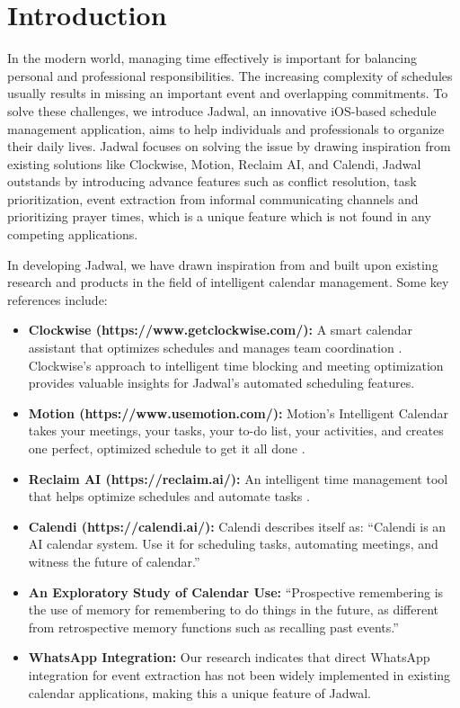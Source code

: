 \documentclass[12pt,a4paper]{report}
\begin{document}
\section{Introduction}
In the modern world, managing time effectively is important for balancing personal and professional responsibilities. The increasing complexity of schedules usually results in missing an important event and overlapping commitments. To solve these challenges, we introduce Jadwal, an innovative iOS-based schedule management application, aims to help individuals and professionals to organize their daily lives.
Jadwal focuses on solving the issue by drawing inspiration from existing solutions like Clockwise, Motion, Reclaim AI, and Calendi, Jadwal outstands by introducing advance features such as conflict resolution, task prioritization, event extraction from informal communicating channels and prioritizing prayer times, which is a unique feature which is not found in any competing applications. 

In developing Jadwal, we have drawn inspiration from and built upon existing research and products in the field of intelligent calendar management. Some key references include:
\begin{itemize}
    \item \textbf{Clockwise (https://www.getclockwise.com/):} A smart calendar assistant that optimizes schedules and manages team coordination \cite{clockwise}. Clockwise's approach to intelligent time blocking and meeting optimization provides valuable insights for Jadwal's automated scheduling features.
    \item \textbf{Motion (https://www.usemotion.com/):} Motion's Intelligent Calendar takes your meetings, your tasks, your to-do list, your activities, and creates one perfect, optimized schedule to get it all done \cite{motion}.
    \item \textbf{Reclaim AI (https://reclaim.ai/):} An intelligent time management tool that helps optimize schedules and automate tasks \cite{reclaim}.
    \item \textbf{Calendi (https://calendi.ai/):} Calendi describes itself as: ``Calendi is an AI calendar system. Use it for scheduling tasks, automating meetings, and witness the future of calendar.'' \cite{calendi}
    \item \textbf{An Exploratory Study of Calendar Use:} ``Prospective remembering is the use of memory for remembering to do things in the future, as different from retrospective memory functions such as recalling past events.'' \cite{tungare2008exploratorystudycalendaruse}
    \item \textbf{WhatsApp Integration:} Our research indicates that direct WhatsApp integration for event extraction has not been widely implemented in existing calendar applications, making this a unique feature of Jadwal.
\end{itemize}
\end{document}
